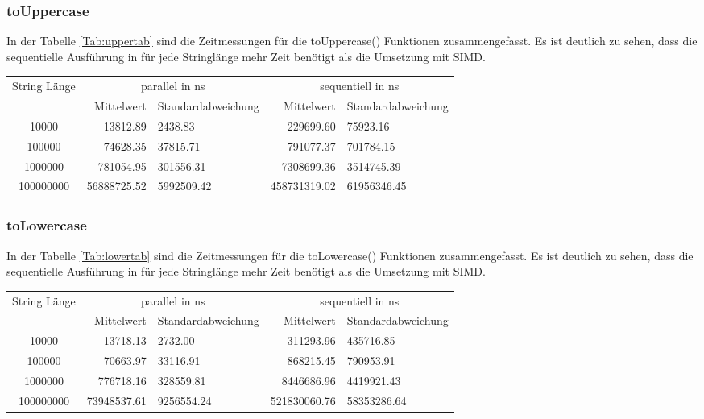 \documentclass[plainarticle,zihtitle,german,final,hyperref,utf8]{zihpub}
\begin{document}
\subsubsection{toUppercase}
In der Tabelle \ref{Tab:uppertab} sind die Zeitmessungen für die toUppercase() Funktionen zusammengefasst.
Es ist deutlich zu sehen, dass die se­quen­ti­elle Ausführung in für jede Stringlänge mehr Zeit benötigt als die Umsetzung mit SIMD.
\newline
\begin{tabular}{|c|r|l|r|l|}
	\hline
	\multicolumn{1}{|c|}{String Länge} & \multicolumn{2}{c|}{parallel in ns} & \multicolumn{2}{c|}{se­quen­tiell­ in ns} \\
	\cline{2-5}
	& Mittelwert & Standardabweichung  & Mittelwert & Standardabweichung \\
	\hline
	10000 & 13812.89 & 2438.83 & 229699.60 & 75923.16 \\
	100000 & 74628.35 & 37815.71 & 791077.37 & 701784.15 \\
	1000000 & 781054.95 & 301556.31 & 7308699.36 & 3514745.39 \\
	100000000 & 56888725.52 & 5992509.42 & 458731319.02 & 61956346.45 \\
	\hline
\end{tabular}
\label{Tab:uppertab}


\subsubsection{toLowercase}
In der Tabelle \ref{Tab:lowertab} sind die Zeitmessungen für die toLowercase() Funktionen zusammengefasst.
Es ist deutlich zu sehen, dass die sequentielle Ausführung in für jede Stringlänge mehr Zeit benötigt als die Umsetzung mit SIMD.
\newline
\begin{tabular}{|c|r|l|r|l|}
	\hline
	\multicolumn{1}{|c|}{String Länge} & \multicolumn{2}{c|}{parallel in ns} & \multicolumn{2}{c|}{sequentiell in ns} \\
	\cline{2-5}
	& Mittelwert & Standardabweichung  & Mittelwert & Standardabweichung \\
	\hline
	10000 & 13718.13 & 2732.00 & 311293.96 & 435716.85 \\
	100000 & 70663.97 & 33116.91 & 868215.45 & 790953.91 \\
	1000000 & 776718.16 & 328559.81 & 8446686.96 & 4419921.43 \\
	100000000 & 73948537.61 & 9256554.24 & 521830060.76 & 58353286.64 \\
	\hline
\end{tabular}
\label{Tab:lowertab}
\end{document}
